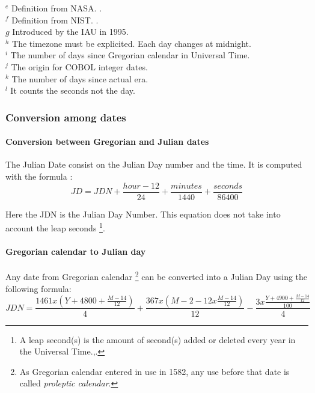 \begin{table}
$^e$ Definition from NASA. \cite{Sch}. \\
$^f$ Definition from NIST. \cite{Nis}. \\
$g$ Introduced by the IAU in 1995. \\
$^h$ The timezone must be explicited. Each day changes at midnight. \\
$^i$ The number of days since Gregorian calendar in Universal Time. \\
$^j$ The origin for COBOL integer dates. \\
$^k$  The number of days since actual era. \\
$^l$  It counts the seconds not the day. \\
\end{table}


\subsubsection{Conversion among dates}
\paragraph{Conversion between Gregorian and Julian dates}
The Julian Date consist on the Julian Day number and the time. It is computed with the formula \cite{Usn}:\\
\begin{equation}
\label{eq:julian day}
JD = JDN + \frac{hour-12}{24} + \frac{minutes}{1440} + \frac{seconds}{86400}
\end{equation}

Here the JDN is the Julian Day Number. This equation does not take into account the leap seconds \footnote{A leap second(s) is the amount of second(s) added or deleted every year in the Universal Time.\cite{Wik},\cite{Lea}. }.

\paragraph{Gregorian calendar to Julian day}
Any date from Gregorian calendar \footnote{As Gregorian calendar entered in use in 1582, any use before that date is called \emph{proleptic calendar}.} can be converted into a Julian Day using the following formula:\\
\begin{equation}
\label{eq:JDN}
JDN = \frac{1461x(Y + 4800 + \frac{M-14}{12})}{4}+\frac{367x(M-2-12x\frac{M-14}{12})}{12}-\frac{3x\frac{Y+4900+\frac{M-14}{12}}{100}}{4} 
\end{equation}

